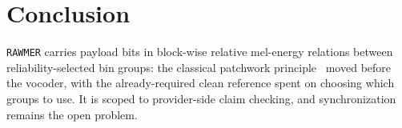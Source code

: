 \section{Conclusion}
\label{sec:conclusion}
\texttt{RAWMER} carries payload bits in block-wise relative mel-energy relations
between reliability-selected bin groups: the classical patchwork
principle~\cite{bender1996,yeo2003} moved before the vocoder, with the already-required
clean reference spent on choosing which groups to use. It is scoped to provider-side
claim checking, and synchronization remains the open problem.
